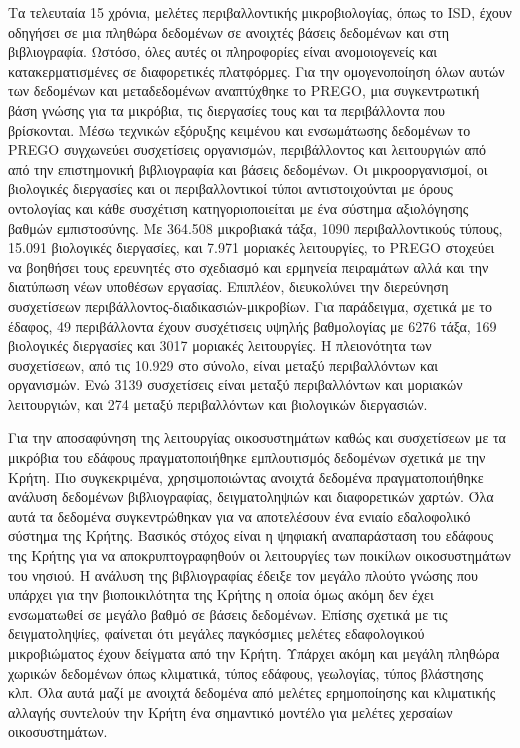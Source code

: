 \documentclass[11pt]{article}
\begin{document}
Τα τελευταία 15 χρόνια, μελέτες περιβαλλοντικής μικροβιολογίας, όπως το \textlatin{ISD}, 
έχουν οδηγήσει σε μια πληθώρα δεδομένων σε ανοιχτές βάσεις δεδομένων και στη
βιβλιογραφία.
Ωστόσο, όλες αυτές οι πληροφορίες είναι ανομοιογενείς και κατακερματισμένες σε διαφορετικές πλατφόρμες.
Για την ομογενοποίηση όλων αυτών των δεδομένων και μεταδεδομένων 
αναπτύχθηκε το \textlatin{PREGO}, μια συγκεντρωτική βάση γνώσης για τα μικρόβια, τις διεργασίες τους και
τα περιβάλλοντα που βρίσκονται.
Μέσω τεχνικών εξόρυξης κειμένου και ενσωμάτωσης δεδομένων το \textlatin{PREGO} συγχωνεύει 
συσχετίσεις οργανισμών, περιβάλλοντος και λειτουργιών από
από την επιστημονική βιβλιογραφία και βάσεις δεδομένων. 
Οι μικροοργανισμοί, οι βιολογικές διεργασίες και οι περιβαλλοντικοί τύποι αντιστοιχούνται
με όρους οντολογίας και κάθε συσχέτιση κατηγοριοποιείται με ένα σύστημα αξιολόγησης 
βαθμών εμπιστοσύνης.
Με 364.508 μικροβιακά τάξα, 1090 περιβαλλοντικούς τύπους, 15.091 βιολογικές διεργασίες,
και 7.971 μοριακές λειτουργίες, το \textlatin{PREGO} στοχεύει να βοηθήσει τους ερευνητές στο 
σχεδιασμό και ερμηνεία πειραμάτων αλλά και την διατύπωση νέων υποθέσων εργασίας.
Επιπλέον, διευκολύνει την διερεύνηση συσχετίσεων περιβάλλοντος-διαδικασιών-μικροβίων.
Για παράδειγμα, σχετικά με το έδαφος, 49 περιβάλλοντα έχουν συσχέτισεις υψηλής βαθμολογίας με 
6276 τάξα, 169 βιολογικές διεργασίες και 3017 μοριακές λειτουργίες.
Η πλειονότητα των συσχετίσεων, από τις 10.929 στο σύνολο, είναι μεταξύ περιβαλλόντων 
και οργανισμών. Ενώ 3139 συσχετίσεις είναι μεταξύ περιβαλλόντων και μοριακών λειτουργιών, 
και 274 μεταξύ περιβαλλόντων και βιολογικών διεργασιών.

Για την αποσαφύνηση της λειτουργίας οικοσυστημάτων καθώς και συσχετίσεων με τα 
μικρόβια του εδάφους πραγματοποιήθηκε εμπλουτισμός δεδομένων σχετικά με την Κρήτη.
Πιο συγκεκριμένα, χρησιμοποιώντας ανοιχτά δεδομένα πραγματοποιήθηκε ανάλυση 
δεδομένων βιβλιογραφίας, δειγματοληψιών και διαφορετικών χαρτών. Όλα αυτά τα δεδομένα
συγκεντρώθηκαν για να αποτελέσουν ένα ενιαίο εδαλοφολικό σύστημα της Κρήτης. 
Βασικός στόχος είναι η ψηφιακή αναπαράσταση του εδάφους της Κρήτης για να αποκρυπτογραφηθούν
οι λειτουργίες των ποικίλων οικοσυστημάτων του νησιού.
Η ανάλυση της βιβλιογραφίας έδειξε τον μεγάλο πλούτο γνώσης που υπάρχει για την 
βιοποικιλότητα της Κρήτης η οποία όμως ακόμη δεν έχει ενσωματωθεί σε μεγάλο βαθμό σε βάσεις 
δεδομένων. 
Επίσης σχετικά με τις δειγματοληψίες, φαίνεται ότι μεγάλες παγκόσμιες 
μελέτες εδαφολογικού μικροβιώματος έχουν δείγματα από την Κρήτη. 
Υπάρχει ακόμη και μεγάλη πληθώρα χωρικών δεδομένων όπως κλιματικά, 
τύπος εδάφους, γεωλογίας, τύπος βλάστησης κλπ.
Όλα αυτά μαζί με ανοιχτά δεδομένα από μελέτες ερημοποίησης και κλιματικής αλλαγής
συντελούν την Κρήτη ένα σημαντικό μοντέλο για μελέτες χερσαίων οικοσυστημάτων.
\end{document}
